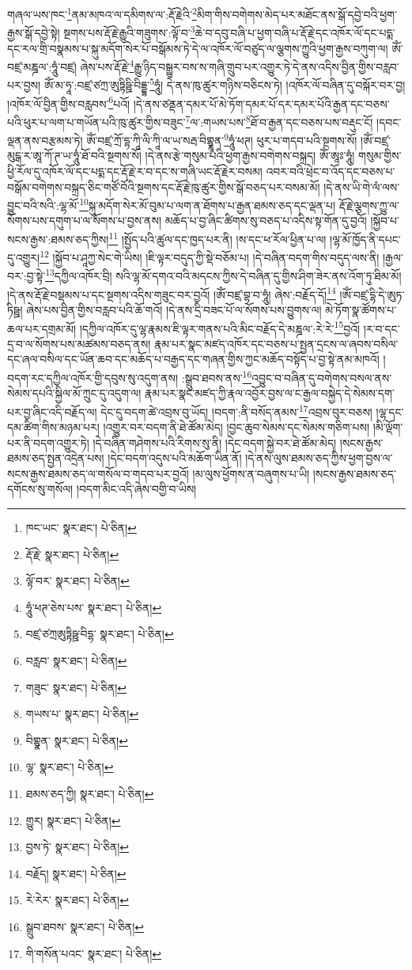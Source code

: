 གཞལ་ཡས་ཁང་\footnote{ཁང་ཡང་  སྣར་ཐང་།  པེ་ཅིན། }ནམ་མཁའ་ལ་དམིགས་ལ་:རྡོ་རྗེའི་\footnote{རྡོ་རྗེ་  སྣར་ཐང་།  པེ་ཅིན། }མིག་གིས་བགེགས་མེད་པར་མཐོང་ནས་སྒོ་དབྱེ་བའི་ཕྱག་རྒྱས་སྒོ་དབྱེ་སྟེ། སྔགས་པས་རྡོ་རྗེ་རྒྱུའི་གཟུགས་:ལྟོ་བ་\footnote{ལྟོ་བར་  སྣར་ཐང་།  པེ་ཅིན། }ཆེ་བ་དབུ་བཞི་པ་ཕྱག་བཞི་པ་རྡོ་རྗེ་དང་འཁོར་ལོ་དང་པདྨ་དང་རལ་གྲི་བསྣམས་པ་སྐུ་མདོག་སེར་པོ་བསྒོམས་ཏེ་དེ་ལ་འཁོར་ལོ་བཙུད་ལ་ལྕགས་ཀྱུའི་ཕྱག་རྒྱས་བཀུག་ལ། ཨོཾ་བཛྲ་མཎྜལ་:ཧཱུཾ་བཛྲ། ཞེས་པས་རྡོ་རྗེ་\footnote{ཧཱུཾ་ཕཊ་ཅེས་པས་  སྣར་ཐང་།  པེ་ཅིན། }རྒྱུ་ཉིད་བསྒྱུར་བས་ས་གཞི་གྲུབ་པར་འགྱུར་ཏེ་དེ་ནས་འདིས་བྱིན་གྱིས་བརླབ་པར་བྱས། ཨོཾ་མ་ཧཱ་:བཛྲ་ཙཀྲ་ཨུཏྟིཥྛི་བིདྡྷ་\footnote{བཛྲ་ཙཀྲཨུཏྟིཥྛ་བིདྷ་  སྣར་ཐང་།  པེ་ཅིན། }ཧཱུཾ། དེ་ནས་ཁུ་ཚུར་གཉིས་བཅིངས་ཏེ། །འཁོར་ལོ་བཞིན་དུ་བསྐོར་བར་བྱ། །འཁོར་ལོ་བྱིན་གྱིས་བརླབས་\footnote{བརླབ་  སྣར་ཐང་།  པེ་ཅིན། }པའོ། །དེ་ནས་ཙནྡན་དམར་པོ་མེ་ཏོག་དམར་པོ་དར་དམར་པོའི་རྒྱན་དང་བཅས་པའི་ཕུར་པ་ལག་པ་གཡོན་པའི་ཁུ་ཚུར་གྱིས་བཟུང་\footnote{གཟུང་  སྣར་ཐང་།  པེ་ཅིན། }ལ་:གཡས་པས་\footnote{གཡས་པ་  སྣར་ཐང་།  པེ་ཅིན། }ཐོ་བ་རྒྱན་དང་བཅས་པས་བརྡུང་ངོ། །དབང་ལྡན་ནས་བརྩམས་ཏེ། ཨོཾ་བཛྲ་ཀྲོ་དྷ་ཀཱི་ལི་ཀཱི་ལ་ཡ་སརྦ་བིགྷྣཱན་\footnote{བིགྷྣན་  སྣར་ཐང་།  པེ་ཅིན། }ཧཱུཾ་ཕཊ། ཕུར་པ་གདབ་པའི་སྔགས་སོ། །ཨོཾ་བཛྲ་མུངྒ་ར་ཨཱ་ཀོ་ཊ་ཡ་ཧཱུཾ་ཐོ་བའི་སྔགས་སོ། །དེ་ནས་རྩེ་གསུམ་པའི་ཕྱག་རྒྱས་བགེགས་བསྐྲད། ཨོཾ་ཨཱཿ་ཧཱུཾ། གསུམ་གྱིས་ཕྱི་རོལ་དུ་འཁོར་ལོ་དང་པདྨ་དང་རྡོ་རྗེ་ར་བ་དང་ས་གཞི་ཡང་རྡོ་རྗེར་བསམ། འབར་བའི་ཕྲེང་བ་འོད་དང་བཅས་པ་བསྒོམ་བགེགས་བསྐྲད་ཅིང་གཙོ་བོའི་སྔགས་དང་རྡོ་རྗེ་ཁུ་ཚུར་གྱིས་སྒོ་བཅད་པར་བསམ་མོ། །དེ་ནས་ཡི་གེ་ལཾ་ལས་བྱུང་བའི་སའི་:ལྷ་མོ་\footnote{ལྷ་  སྣར་ཐང་།  པེ་ཅིན། }སྐུ་མདོག་སེར་མོ་བུམ་པ་ལག་ན་ཐོགས་པ་རྒྱན་ཐམས་ཅད་དང་ལྡན་པ། རྡོ་རྗེ་ལྕགས་ཀྱུ་ལ་སོགས་པས་དགུག་པ་ལ་སོགས་པ་བྱས་ནས། མཆོད་པ་བྱ་ཞིང་ཚིགས་སུ་བཅད་པ་འདིས་སྟ་གོན་དུ་བྱའོ། །སྐྱོབ་པ་སངས་རྒྱས་:ཐམས་ཅད་ཀྱིས།\footnote{ཐམས་ཅད་ཀྱི།  སྣར་ཐང་།  པེ་ཅིན། } །སྤྱོད་པའི་ཚུལ་དང་ཁྱད་པར་ནི། །ས་དང་ཕ་རོལ་ཕྱིན་པ་ལ། །ལྷ་མོ་ཁྱོད་ནི་དཔང་དུ་འགྱུར།\footnote{གྱུར།  སྣར་ཐང་།  པེ་ཅིན། } །སྐྱོབ་པ་ཤཱཀྱ་སེང་གེ་ཡིས། །ཇི་ལྟར་བདུད་ཀྱི་སྡེ་བཅོམ་པ། །དེ་བཞིན་བདག་གིས་བདུད་ལས་ནི། །རྒྱལ་བར་:བྱ་སྟེ་\footnote{བྱས་ཏེ་  སྣར་ཐང་།  པེ་ཅིན། }དཀྱིལ་འཁོར་བྲི། སའི་ལྷ་མོ་དགའ་བའི་མདངས་ཀྱིས་དེ་བཞིན་དུ་གྱིས་ཤིག་ཟེར་ནས་འོག་ཏུ་ཐིམ་མོ། །དེ་ནས་རྡོ་རྗེ་བསྡམས་པ་དང་སྔགས་འདིས་གཟུང་བར་བྱའོ། །ཨོཾ་བཛྲ་བྷ་བ་ཧཱུཾ། ཞེས་:བརྗོད་དོ།\footnote{བརྗོད།  སྣར་ཐང་།  པེ་ཅིན། } །ཨོཾ་བཛྲ་དྷི་དེ་ཨུཏ་ཏིཥྛ། ཞེས་པས་བྱིན་གྱིས་བརླབ་པའི་ཆོ་གའོ། །དེ་ནས་དྲི་བཟང་པོ་ལ་སོགས་པས་བྱུགས་ལ། མེ་ཏོག་སྣ་ཚོགས་པ་ཆལ་པར་དགྲམ་མོ། །དཀྱིལ་འཁོར་དུ་ལྷ་རྣམས་ཇི་ལྟར་གནས་པའི་མིང་བརྗོད་དེ་མཎྜལ་:རེ་རེ་\footnote{རེ་རེར་  སྣར་ཐང་།  པེ་ཅིན། }བྱའོ། །ར་བ་དང་དྲ་བ་ལ་སོགས་པས་མཚམས་བཅད་ནས། རྣམ་པར་སྣང་མཛད་འཁོར་དང་བཅས་པ་སྤྱན་དྲངས་ལ་ཞབས་བསིལ་དང་ཞལ་བསིལ་དང་ཡོན་ཆབ་དང་མཆོད་པ་བརྒྱད་དང་གཞན་གྱིས་ཀྱང་མཆོད་བསྟོད་པ་བྱ་སྟེ་ནམ་མཁའོ། །བདག་རང་དཀྱིལ་འཁོར་གྱི་དབུས་སུ་འདུག་ནས། :སྒྲུབ་ཐབས་ནས་\footnote{སྒྲུབ་ཐབས་  སྣར་ཐང་།  པེ་ཅིན། }འབྱུང་བ་བཞིན་དུ་བགེགས་བསལ་ནས་སེམས་དཔའི་སྐྱིལ་མོ་ཀྲུང་དུ་འདུག་ལ། རྣམ་པར་སྣང་མཛད་ཀྱི་རྣལ་འབྱོར་བྱས་ལ་ང་རྒྱལ་བསྐྱེད་དེ་སེམས་དག་པར་བྱ་ཞིང་འདི་བརྗོད་ལ། དེང་དུ་བདག་ཚེ་འབྲས་བུ་ཡོད། །བདག་:ནི་བསོད་ནམས་\footnote{གི་གསོན་པའང་  སྣར་ཐང་།  པེ་ཅིན། }འབྲས་བུར་བཅས། །ལྷ་དང་དམ་ཚིག་གིས་མཉམ་པར། །འགྱུར་བར་བདག་ནི་ཐེ་ཚོམ་མེད། །བྱང་ཆུབ་སེམས་དང་སེམས་གཅིག་པས། །མི་ལྡོག་པར་ནི་བདག་འགྱུར་ཏེ། །དེ་བཞིན་གཤེགས་པའི་རིགས་སུ་ནི། །དེང་བདག་སྐྱེ་བར་ཐེ་ཚོམ་མེད། །སངས་རྒྱས་ཐམས་ཅད་སྤྱན་འདྲེན་པས། །དེང་བདག་འདུས་པའི་མཆོག་ཡིན་ནོ། །དེ་ནས་ལུས་ཐམས་ཅད་ཀྱིས་ཕྱག་བྱས་ལ་སངས་རྒྱས་ཐམས་ཅད་ལ་གསོལ་བ་གདབ་པར་བྱའོ། །མ་ལུས་ཕྱོགས་ན་བཞུགས་པ་ཡི། །སངས་རྒྱས་ཐམས་ཅད་དགོངས་སུ་གསོལ། །བདག་མིང་འདི་ཞེས་བགྱི་བ་ཡིས། 